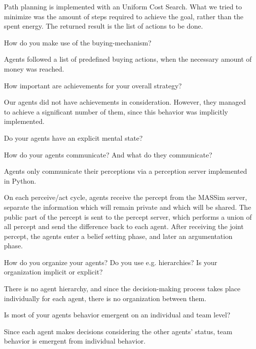 Path planning is
implemented with an Uniform Cost Search. What we tried to minimize was the
amount of steps required to achieve the goal, rather than the spent energy.
The returned result is the list of actions to be done.

\begin{question}
How do you make use of the buying-mechanism?  
\end{question}

Agents followed a list of
predefined buying actions, when the necessary amount of money was reached.

\begin{question}
How important are achievements for your overall strategy?  
\end{question}

Our agents did
not have achievements in consideration. However, they managed to achieve a
significant number of them, since this behavior was implicitly implemented.

\begin{question}
Do your agents have an explicit mental state?
\end{question}


\begin{question}
How do your agents communicate? And what do they communicate?  
\end{question}

Agents only
communicate their perceptions via a perception server implemented in Python.

On each perceive/act cycle, agents receive the percept from the
MASSim server, separate the information which will remain private and which
will be shared.  The public part of the percept is sent to the percept server,
which performs a union of all percept and send the difference back to each
agent. After receiving the joint percept, the agents enter a belief setting
phase, and later an argumentation phase.


\begin{question}
How do you organize your agents? Do you use e.g. hierarchies? Is your
organization implicit or explicit?
\end{question}
There is no agent hierarchy, and since the decision-making process takes
place individually for each agent, there is no organization between them.


\begin{question}
Is most of your agents behavior emergent on an individual and team
level?
\end{question}
Since each agent makes decisions considering the other agents' status,
team behavior is emergent from individual behavior.

